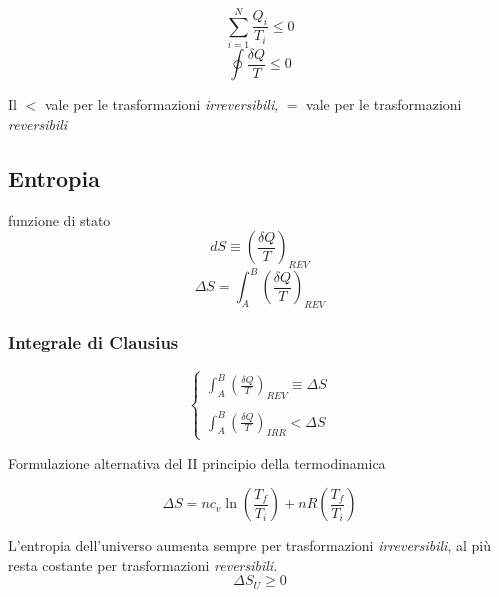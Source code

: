 \begin{equation}
    \sum_{i=1}^{N} \frac{Q_i}{T_i} \leq 0
\end{equation}
\begin{equation}
    \boxed{\oint \frac{\delta Q}{T} \leq 0}
\end{equation}

Il $<$ vale per le trasformazioni \emph{irreversibili}, 
$=$ vale per le trasformazioni \emph{reversibili}

\subsection{Entropia}
 funzione di stato
\begin{equation}
    dS \equiv \left ( \frac{\delta Q}{T} \right )_{REV}
\end{equation}
\begin{equation}
    \boxed{\Delta S = \int_A^B \left ( \frac{\delta Q}{T} \right )_{REV}}
\end{equation}

\subsubsection{Integrale di Clausius}
\begin{equation}
    \begin{cases}
        \int_A^B \left ( \frac{\delta Q}{T} \right )_{REV} \equiv \Delta S\\ \\
        \int_A^B \left ( \frac{\delta Q}{T} \right )_{IRR} < \Delta S
    \end{cases}
\end{equation}

Formulazione alternativa del II principio della termodinamica

\vspace{\baselineskip}
\begin{equation}
    \boxed{\Delta S = n c_v \ln{\left ( \frac{T_f}{T_i} \right )} + n R \left ( \frac{T_f}{T_i} \right )}
\end{equation}

\vspace{\baselineskip}
 L'entropia dell'universo aumenta sempre per trasformazioni \emph{irreversibili}, al più resta costante per trasformazioni \emph{reversibili}.
\[
\Delta S_U \geq 0
\]